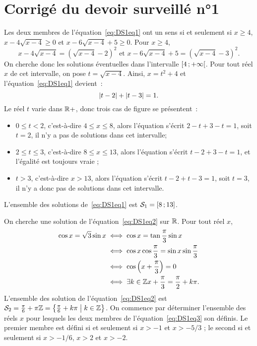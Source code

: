 \chapter{Corrigé du devoir surveillé n°1}
\begin{exercice}
    Les deux membres de l'équation~\eqref{eq:DS1eq1} ont un sens si et seulement si \(x \geq 4\), \(x-4\sqrt{x-4} \geq 0\) et \(x-6\sqrt{x-4}+5\geq 0\). Pour \(x \geq 4\),
    \[x - 4\sqrt{x-4} = (\sqrt{x-4}-2)^2 \text{~et~} x-6\sqrt{x-4}+5 = (\sqrt{x-4}-3)^2.\]
    On cherche donc les solutions éventuelles dans l'intervalle \(\left[ 4 \, ;  +\infty \right[\). Pour tout réel \(x\) de cet intervalle, on pose \(t = \sqrt{x-4}\). Ainsi, \(x = t^2+4\) et l'équation~\eqref{eq:DS1eq1} devient~:
    \[\left\lvert t-2\right\rvert + \left\lvert t-3\right\rvert = 1.\] Le réel \(t\) varie dans \(\mathbb{R}+\), donc trois cas de figure se présentent~:
    \begin{itemize}
        \item \(0 \leq t < 2\), c'est-à-dire \(4\leq x \leq 8\),  alors l'équation s'écrit \(2-t+3-t=1\), soit \(t=2\), il n'y a pas de solutions dans cet intervalle;
        \item \(2 \leq t \leq 3\), c'est-à-dire \(8\leq x \leq 13\), alors l'équation s'écrit \(t-2+3-t=1\), et l'égalité est toujours vraie ;
        \item \(t > 3\), c'est-à-dire \(x > 13\), alors l'équation s'écrit \(t-2+t-3=1\), soit \(t=3\), il n'y a donc pas de solutions dans cet intervalle.
    \end{itemize}
    L'ensemble des solutions de~\eqref{eq:DS1eq1} est \(\mathcal{S}_1 = \left[ 8 \, ;  13 \right]\).

    On cherche une solution de l'équation~\eqref{eq:DS1eq2} sur \(\mathbb{R}\). Pour tout réel \(x\),
    \begin{align*}
        \cos x = \sqrt{3}\sin x &\iff \cos x = \tan\frac{\pi}{3} \sin x \\
                                &\iff \cos x \cos \frac{\pi}{3} = \sin x \sin\frac{\pi}{3} \\
                                &\iff \cos\left(x+\frac{\pi}{3}\right) = 0 \\
                                &\iff \exists k \in \mathbb{Z} x +\frac{\pi}{3} = \frac{\pi}{2}+k\pi.
    \end{align*}
    L'ensemble des solution de l'équation~\eqref{eq:DS1eq2} est \(\mathcal{S}_2 = \frac{\pi}{6}+\pi\mathbb{Z} = \left\{\frac{\pi}{6}+k\pi\mathrel{}\middle|\mathrel{}k \in \mathbb{Z}\right\}\).
    On commence par déterminer l'ensemble des réels \(x\) pour lesquels les deux membres de l'équation~\eqref{eq:DS1eq3} son définis. Le premier membre est défini si et seulement si \(x>-1\) et \(x>-5/3\) ; le second si et seulement si \(x>-1/6\), \(x>2\) et \(x>-2\).
\end{exercice}
